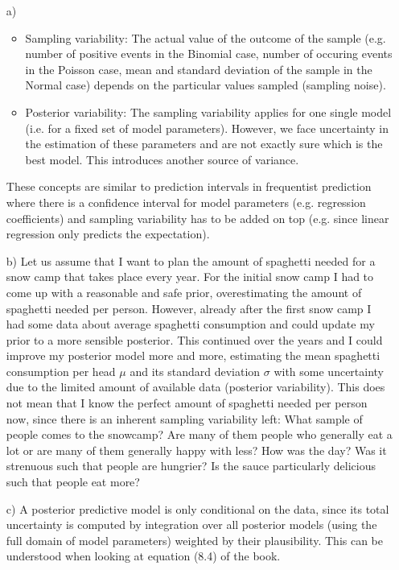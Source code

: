 \documentclass[fontsize=11pt,DIV=18,parskip=half]{scrartcl}
\begin{document}
\begin{enumerate}
\item[a)] 
	\begin{itemize}
		\item Sampling variability: The actual value of the outcome of the sample (e.g. number of positive events in the Binomial case, number of occuring events in the Poisson case, mean and standard deviation of the sample in the Normal case) depends on the particular values sampled (sampling noise).
		\item Posterior variability: The sampling variability applies for one single model (i.e. for a fixed set of model parameters). However, we face uncertainty in the estimation of these parameters and are not exactly sure which is the best model. This introduces another source of variance.
	\end{itemize}
	
	These concepts are similar to prediction intervals in frequentist prediction where there is a confidence interval for model parameters (e.g. regression coefficients) and sampling variability has to be added on top (e.g. since linear regression only predicts the expectation).

\item[b)] Let us assume that I want to plan the amount of spaghetti needed for a snow camp that takes place every year. For the initial snow camp I had to come up with a reasonable and safe prior, overestimating the amount of spaghetti needed per person. However, already after the first snow camp I had some data about average spaghetti consumption and could update my prior to a more sensible posterior. This continued over the years and I could improve my posterior model more and more, estimating the mean spaghetti consumption per head $\mu$ and its standard deviation $\sigma$ with some uncertainty due to the limited amount of available data (posterior variability). This does not mean that I know the perfect amount of spaghetti needed per person now, since there is an inherent sampling variability left: What sample of people comes to the snowcamp? Are many of them people who generally eat a lot or are many of them generally happy with less? How was the day? Was it strenuous such that people are hungrier? Is the sauce particularly delicious such that people eat more?


\item[c)] A posterior predictive model is only conditional on the data, since its total uncertainty is computed by integration over all posterior models (using the full domain of model parameters) weighted by their plausibility. This can be understood when looking at equation (8.4) of the book.
\end{enumerate}
\end{document}
